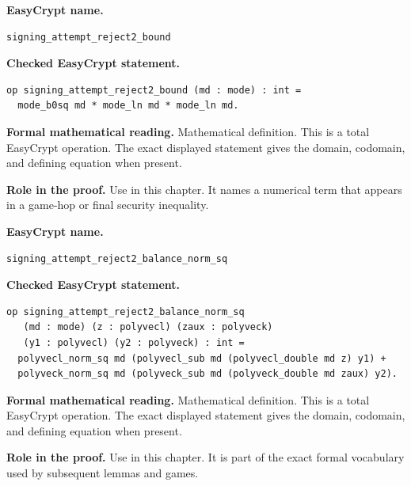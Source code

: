 \begin{formaldefinition}
\noindent\textbf{EasyCrypt name.}
\begin{lstlisting}[language=EasyCrypt,basicstyle=\ttfamily\scriptsize]
signing_attempt_reject2_bound
\end{lstlisting}
\noindent\textbf{Checked EasyCrypt statement.}
\begin{lstlisting}[language=EasyCrypt,basicstyle=\ttfamily\scriptsize]
op signing_attempt_reject2_bound (md : mode) : int =
  mode_b0sq md * mode_ln md * mode_ln md.
\end{lstlisting}
\noindent\textbf{Formal mathematical reading.}
Mathematical definition. This is a total EasyCrypt operation.  The exact displayed statement gives the domain, codomain, and defining equation when present.

\noindent\textbf{Role in the proof.}
Use in this chapter. It names a numerical term that appears in a game-hop or final security inequality.

\end{formaldefinition}

\begin{formaldefinition}
\noindent\textbf{EasyCrypt name.}
\begin{lstlisting}[language=EasyCrypt,basicstyle=\ttfamily\scriptsize]
signing_attempt_reject2_balance_norm_sq
\end{lstlisting}
\noindent\textbf{Checked EasyCrypt statement.}
\begin{lstlisting}[language=EasyCrypt,basicstyle=\ttfamily\scriptsize]
op signing_attempt_reject2_balance_norm_sq
   (md : mode) (z : polyvecl) (zaux : polyveck)
   (y1 : polyvecl) (y2 : polyveck) : int =
  polyvecl_norm_sq md (polyvecl_sub md (polyvecl_double md z) y1) +
  polyveck_norm_sq md (polyveck_sub md (polyveck_double md zaux) y2).
\end{lstlisting}
\noindent\textbf{Formal mathematical reading.}
Mathematical definition. This is a total EasyCrypt operation.  The exact displayed statement gives the domain, codomain, and defining equation when present.

\noindent\textbf{Role in the proof.}
Use in this chapter. It is part of the exact formal vocabulary used by subsequent lemmas and games.

\end{formaldefinition}

